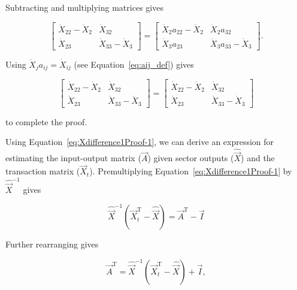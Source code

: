 \noindent Subtracting and multiplying matrices gives

\begin{equation} \label{eq:Xdifference1Proof-3}
	\begin{bmatrix} 	
		\dot{X}_{22} - \dot{X}_{2} & \dot{X}_{32}	\\
		\dot{X}_{23}               & \dot{X}_{33} - \dot{X}_{3}
	\end{bmatrix}
	=
	\begin{bmatrix} 	
		\dot{X}_{2} a_{22} - \dot{X}_{2} & \dot{X}_{2} a_{32}	\\
		\dot{X}_{3} a_{23}               & \dot{X}_{3} a_{33} - \dot{X}_{3}
	\end{bmatrix}.
\end{equation}

\noindent Using $\dot{X}_j a_{ij} = \dot{X}_{ij}$ (see Equation~\ref{eq:aij_def}) gives

\begin{equation} \label{eq:Xdifference1Proof-4}
	\begin{bmatrix} 	
		\dot{X}_{22} - \dot{X}_{2} & \dot{X}_{32}	\\
		\dot{X}_{23}               & \dot{X}_{33} - \dot{X}_{3}
	\end{bmatrix} 
	= 
	\begin{bmatrix} 	
		\dot{X}_{22} - \dot{X}_{2} & \dot{X}_{32}	\\
		\dot{X}_{23}               & \dot{X}_{33} - \dot{X}_{3}
	\end{bmatrix}
\end{equation}

\noindent to complete the proof.

Using Equation~\ref{eq:Xdifference1Proof-1}, 
we can derive an expression for estimating the input-output matrix ($\vec{A}$)
given sector outputs ($\hat{\vec{X}}$) and the transaction matrix ($\vec{X}_{t}$).
Premultiplying Equation~\ref{eq:Xdifference1Proof-1} by $\hat{\vec{X}}^{-1}$ gives

\begin{equation} \label{eq:Xdifference1Proof-5}
	\hat{\vec{X}}^{-1}
	\left( 
		\vec{X}_{t}^\mathrm{T} 
		- \hat{\vec{X}} 
	\right)
	= \vec{A}^\mathrm{T} - \vec{I}
\end{equation}

\noindent{}Further rearranging gives

\begin{equation}\label{eq:Xdifference1Proof-6}
	\vec{A}^\mathrm{T} 
	= \hat{\vec{X}}^{-1}
	\left( 
		\vec{X}_{t}^\mathrm{T} 
		- \hat{\vec{X}} 
	\right)
	+ \vec{I},
\end{equation}

